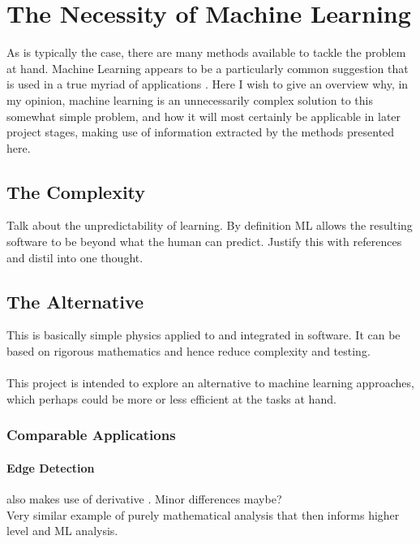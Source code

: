 \documentclass[main.tex]{subfiles}
\begin{document}
      
    
  \section{The Necessity of Machine Learning}
  
    As is typically the case, there are many methods available to tackle the problem at hand. Machine Learning appears to be a particularly common suggestion that is used in a true myriad of applications \cite{}. Here I wish to give an overview why, in my opinion, machine learning is an unnecessarily complex solution to this somewhat simple problem, and how it will most certainly be applicable in later project stages, making use of information extracted by the methods presented here.
    
    \subsection{The Complexity}
    
      Talk about the unpredictability of learning. By definition ML allows the resulting software to be beyond what the human can predict. Justify this with references and distil into one thought.
    
    \subsection{The Alternative}
    
      This is basically simple physics applied to and integrated in software. It can be based on rigorous mathematics and hence reduce complexity and testing.
      \\\\
      This project is intended to explore an alternative to machine learning approaches, which perhaps could be more or less efficient at the tasks at hand. 
    
    \subsubsection*{Comparable Applications}
    
      \paragraph{Edge Detection} %
      also makes use of derivative \cite{}. Minor differences maybe? \\
      Very similar example of purely mathematical analysis that then informs higher level and ML analysis.
    
\end{document}
